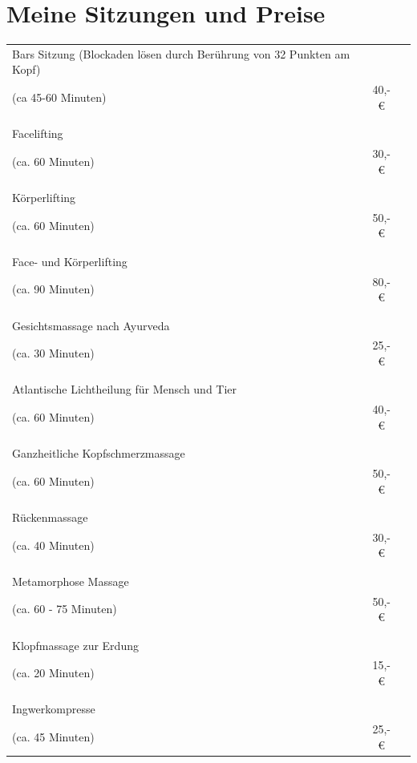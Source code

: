 \documentclass[10pt,foldmark,notumble]{leaflet}
\begin{document}
\section{Meine Sitzungen und Preise}
\begin{tabular}{p{65mm}cr}%
Bars Sitzung (Blockaden lösen durch Berührung von 32 Punkten am Kopf)  &    \\
(ca 45-60 Minuten) &    40,-€  \\
\\
\hline
\\
Facelifting  &    \\
(ca. 60 Minuten) &    30,-€\\
\\
\hline
\\
Körperlifting   &   \\
(ca. 60 Minuten) &    50,-€\\
\\
\hline
\\
Face- und Körperlifting   &    \\
(ca. 90 Minuten) &    80,-€\\
\\
\hline
\\
Gesichtsmassage nach Ayurveda &    \\
(ca. 30 Minuten) &    25,-€ \\
\\
\hline 
\\
Atlantische Lichtheilung für Mensch und Tier  &    \\
(ca. 60 Minuten) &    40,-€ \\
\\
\hline
\\
Ganzheitliche Kopfschmerzmassage &     \\
(ca. 60 Minuten) &    50,-€ \\
\\
\hline
\\
Rückenmassage &    \\
(ca. 40 Minuten) &    30,-€ \\
\\
\hline
\\
Metamorphose Massage  &     \\
(ca. 60 - 75 Minuten) &    50,-€ \\
\\
\hline
\\
Klopfmassage zur Erdung  &    \\
(ca. 20 Minuten) &    15,-€ \\
\\
\hline
\\
Ingwerkompresse  &     \\
(ca. 45 Minuten) &    25,-€ \\

\end{tabular}
\end{document}
